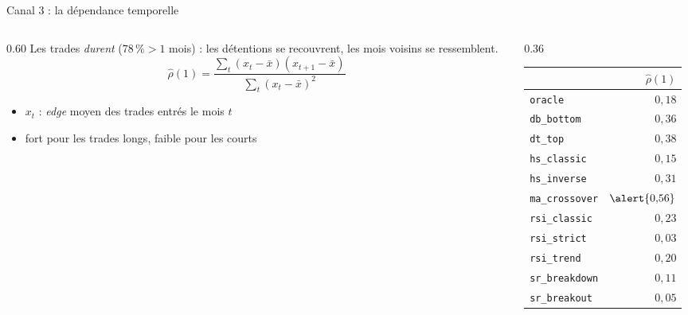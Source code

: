 \documentclass[10pt]{beamer}
\newcommand{\edge}{\textit{edge}}
\begin{document}
\begin{frame}{Canal 3 : la dépendance temporelle}
  \begin{columns}[T]
    \begin{column}{0.60\textwidth}
      \small
      Les trades \emph{durent} ($78\,\% > 1$ mois) : les détentions se
      recouvrent, les mois voisins se ressemblent.
      \[
        \hat\rho(1) = \frac{\sum_t (x_t-\bar x)(x_{t+1}-\bar x)}
                           {\sum_t (x_t-\bar x)^2}
      \]
      \begin{itemize}\setlength{\itemsep}{2.5mm}
        \item $x_t$ : \edge{} moyen des trades entrés le mois $t$
        \item fort pour les trades longs, faible pour les courts
      \end{itemize}
    \end{column}
    \begin{column}{0.36\textwidth}
      \scriptsize
      \begin{tabular}{@{}lr@{}}
        \toprule
        & $\hat\rho(1)$ \\
        \midrule
        \texttt{oracle}        & $0{,}18$ \\
        \midrule
        \texttt{db\_bottom}    & $0{,}36$ \\
        \texttt{dt\_top}       & $0{,}38$ \\
        \texttt{hs\_classic}   & $0{,}15$ \\
        \texttt{hs\_inverse}   & $0{,}31$ \\
        \texttt{ma\_crossover} & $\alert{0{,}56}$ \\
        \texttt{rsi\_classic}  & $0{,}23$ \\
        \texttt{rsi\_strict}   & $0{,}03$ \\
        \texttt{rsi\_trend}    & $0{,}20$ \\
        \texttt{sr\_breakdown} & $0{,}11$ \\
        \texttt{sr\_breakout}  & $0{,}05$ \\
        \bottomrule
      \end{tabular}
    \end{column}
  \end{columns}
\end{frame}
\end{document}
